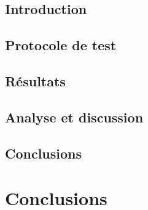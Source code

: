 \documentclass[
a4paper,
11pt,
twoside,
onecolumn,
openright,      %
leqno,          %
final   %
]{phdlasl}
\begin{document}
	\section*{Introduction}\label{partie:resultats-introduction}
	

 	\section{Protocole de test}\label{partie:resultats-routage}
		

	\section{Résultats}\label{partie:resultats-ordonnancement}
	
	
	\section{Analyse et discussion}\label{partie:analyse-discussion}
	

	\section*{Conclusions}\label{partie:resultats-conclusions}
	
	
	\chapter*{Conclusions}\label{chapitre:conclusions}
		
	
	
      
      
\end{document}
